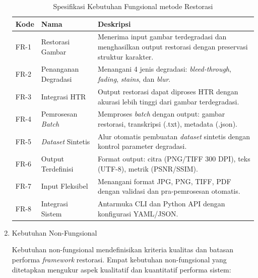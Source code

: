 \begin{enumerate}[label=\arabic*., leftmargin=*]
\begin{table}[htbp!]
    \centering
    \small
    \caption{Spesifikasi Kebutuhan Fungsional metode Restorasi}
    \label{tab:functional_requirements}
    \begin{tabular}{p{}p{}p{}}
        \toprule
        \textbf{Kode} & \textbf{Nama}        & \textbf{Deskripsi}                                                                                        \\
        \midrule
        FR-1          & Restorasi Gambar     & Menerima input gambar terdegradasi dan menghasilkan output restorasi dengan preservasi struktur karakter. \\
        \midrule
        FR-2          & Penanganan Degradasi & Menangani 4 jenis degradasi: \textit{bleed-through}, \textit{fading}, \textit{stains}, dan \textit{blur}. \\
        \midrule
        FR-3          & Integrasi HTR        & Output restorasi dapat diproses HTR dengan akurasi lebih tinggi dari gambar terdegradasi.                 \\
        \midrule
        FR-4          & Pemrosesan \textit{Batch}     & Memproses \textit{batch} dengan output: gambar restorasi, transkripsi (.txt), metadata (.json).                    \\
        \midrule
        FR-5          & \textit{Dataset} Sintetis     & Alur otomatis pembuatan \textit{dataset} sintetis dengan kontrol parameter degradasi.                              \\
        \midrule
        FR-6          & Output Terdefinisi   & Format output: citra (PNG/TIFF 300 DPI), teks (UTF-8), metrik (PSNR/SSIM).                                \\
        \midrule
        FR-7          & Input Fleksibel      & Menangani format JPG, PNG, TIFF, PDF dengan validasi dan pra-pemrosesan otomatis.                         \\
        \midrule
        FR-8          & Integrasi Sistem     & Antarmuka CLI dan Python API dengan konfigurasi YAML/JSON.                                                \\
        \bottomrule
    \end{tabular}
\end{table}



\item Kebutuhan Non-Fungsional

Kebutuhan non-fungsional mendefinisikan kriteria kualitas dan batasan performa \textit{framework} restorasi. Empat kebutuhan non-fungsional yang ditetapkan mengukur aspek kualitatif dan kuantitatif performa sistem:


\end{enumerate}
